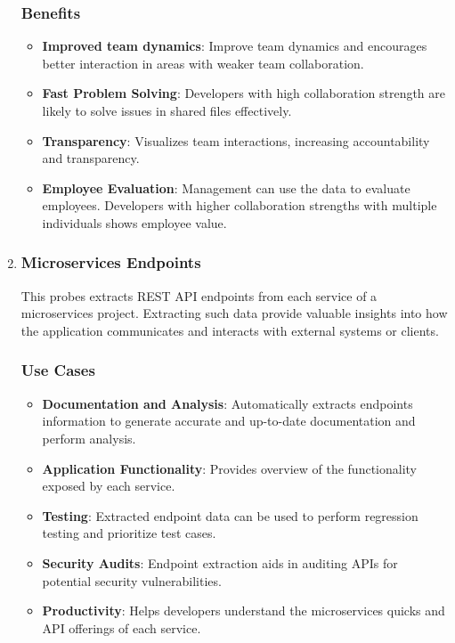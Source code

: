 \begin{enumerate}[leftmargin=*, label=\arabic*.]
	\subsubsection{Benefits}
	\begin{itemize}[label=$\bullet$]
		\item \textbf{Improved team dynamics}: Improve team dynamics and encourages better interaction in areas with weaker team collaboration.
		\item \textbf{Fast Problem Solving}: Developers with high collaboration strength are likely to solve issues in shared files effectively.
		\item \textbf{Transparency}: Visualizes team interactions, increasing accountability and transparency.
		\item \textbf{Employee Evaluation}: Management can use the data to evaluate employees. Developers with higher collaboration strengths with multiple individuals shows employee value.
	\end{itemize} 

    \item \subsubsection*{Microservices Endpoints}
    This probes extracts REST API endpoints from each service of a microservices project. Extracting such data provide valuable insights into how the application communicates and interacts with external systems or clients.
	\subsubsection{Use Cases}
	\begin{itemize}[label=$\bullet$]
		\item \textbf{Documentation and Analysis}: Automatically extracts endpoints information to generate accurate and up-to-date documentation and perform analysis.
		\item \textbf{Application Functionality}: Provides overview of the functionality exposed by each service.
		\item \textbf{Testing}: Extracted endpoint data can be used to perform regression testing and prioritize test cases.
		\item \textbf{Security Audits}: Endpoint extraction aids in auditing APIs for potential security vulnerabilities.
		\item \textbf{Productivity}: Helps developers understand the microservices quicks and API offerings of each service.
	\end{itemize}

\end{enumerate}
